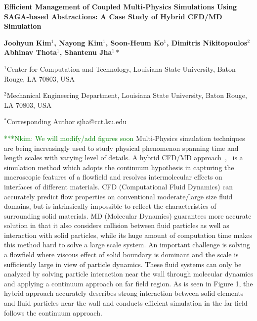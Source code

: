 \documentclass[a4paper]{article}
\newcommand{\Nkimnote}[1]{ {\textcolor{green} { ***Nkim: #1 }}}
\newcommand{\Nkimnote}[1]{}
\begin{document}
\begin{center}


\textbf {\large \bf Efficient Management of Coupled Multi-Physics Simulations
Using SAGA-based Abstractions: A Case Study of  Hybrid CFD/MD Simulation}
\vspace{14pt}

\textbf {\normalsize \hspace{0.6 in} Joohyun Kim$^1$, Nayong Kim$^1$, Soon-Heum Ko$^1$, Dimitris Nikitopoulos$^2$  \newline Abhinav Thota$^1$, Shantenu Jha$^1*$ }

\vspace{12pt}

\normalsize { \hspace{0.6 in} $^1$Center for Computation and Technology, \newline Louisiana State University, Baton Rouge, LA 70803, USA}

\normalsize {\hspace{0.6 in} $^2$Mechanical Engineering Department, \newline Louisiana State University, Baton Rouge, LA 70803, USA}

\vspace{0.2in}
\footnotesize {\hspace{0.0 in} $^*$Corresponding Author sjha@cct.lsu.edu}


\vspace{12pt}

\end{center}

\Nkimnote{We will modify/add figures soon}
Multi-Physics simulation techniques are being increasingly used to study physical phenomenon spanning time and length scales with varying level of details.  A hybrid CFD/MD approach~\cite{Nie:2004},~\cite{Yen:2007} is a simulation method which adopts the continuum hypothesis in capturing the macroscopic features of a flowfield and resolves intermolecular effects on interfaces of different materials. CFD (Computational Fluid Dynamics) can accurately predict flow properties on conventional moderate/large size fluid domains, but is intrinsically impossible to reflect the characteristics of surrounding solid materials. MD (Molecular Dynamics) guarantees more accurate solution in that it also considers collision between fluid particles as well as interaction with solid particles, while its huge amount of computation time makes this method hard to solve a large scale system. An important challenge is solving a flowfield where viscous effect of solid boundary is dominant and the scale is sufficiently large in view of particle dynamics. These fluid systems can only be analyzed by solving particle interaction near the wall through molecular dynamics and applying a continuum approach on far field region. As is seen in Figure 1, the hybrid approach accurately describes strong interaction between solid elements and fluid particles near the wall and conducts efficient simulation in the far field follows the continuum approach.
\end{document}
